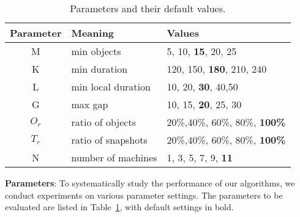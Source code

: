 \begin{table}[h]
\small
\begin{tabular}{c|l|p{3cm}}
\hline 
\textbf{Parameter} & \textbf{Meaning} & \textbf{Values} \\ 
\hline 
M & min  objects &  5, 10,  \textbf{15}, 20, 25 \\ 
\hline 
K & min duration & 120, 150, \textbf{180}, 210, 240 \\ 
\hline 
L & min local duration & 10, 20, \textbf{30}, 40,50 \\ 
\hline 
G & max gap & 10, 15, \textbf{20}, 25, 30 \\ 
\hline
$O_r$ & ratio of objects & 20\%,40\%, 60\%, 80\%, \textbf{100\%} \\ \hline
$T_r$ & ratio of snapshots & 20\%,40\%, 60\%, 80\%, \textbf{100\%} \\ \hline
N & number of machines & 1, 3, 5, 7, 9, \textbf{11}\\ 
\hline 
\end{tabular} 
 \vspace{-0.5em}
\caption{Parameters and their default values.}
 \vspace{-0.5em}
\label{tbl:parameters}
\end{table}

\textbf{Parameters}: To systematically study the performance of
our algorithms, we conduct experiments on various parameter settings. The parameters to be evaluated are listed in Table~\ref{tbl:parameters}, with default settings in bold. 


